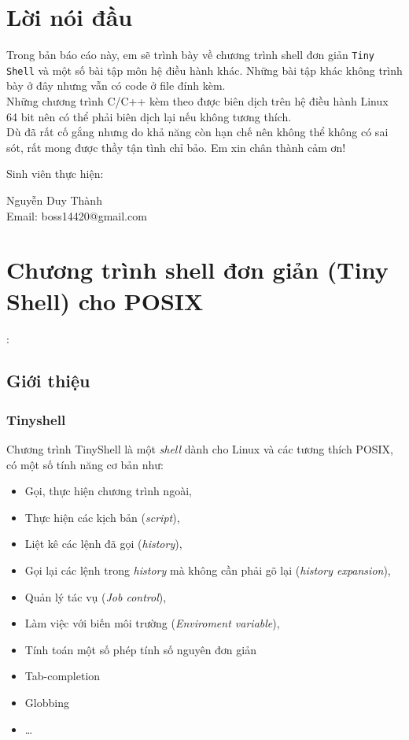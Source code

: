\documentclass[a4paper,12pt]{report}
\begin{document}
    \newpage

    \tableofcontents
    \newpage
\chapter{Lời nói đầu}
    Trong bản báo cáo này, em sẽ trình bày về chương trình shell đơn giản
    \texttt{Tiny Shell} và một số bài tập môn hệ điều hành khác. Những bài tập
    khác không trình bày ở đây nhưng vẫn có code ở file đính kèm.\\
    Những chương trình C/C++ kèm theo được biên dịch trên hệ điều hành Linux 64
    bit nên có thể phải biên dịch lại nếu không tương thích.\\

    Dù đã rất cố gắng nhưng do khả năng còn hạn chế nên không thể không có sai sót, rất
    mong được thầy tận tình chỉ bảo. Em xin chân thành cảm ơn!\\
    \begin{center}
        Sinh viên thực hiện:
        \parbox[t]{4cm}{Nguyễn Duy Thành \\ Email: boss14420@gmail.com}
    \end{center}



\chapter{Chương trình shell đơn giản (Tiny Shell) cho POSIX}:
    \section{Giới thiệu}
        \subsection{Tinyshell}
        Chương trình TinyShell là một \textit{shell} dành cho Linux và các tương
        thích POSIX, có một số tính năng cơ bản như:
        \begin{itemize}
            \item Gọi, thực hiện chương trình ngoài,
            \item Thực hiện các kịch bản (\textit{script}),
            \item Liệt kê các lệnh đã gọi (\textit{history}),
            \item Gọi lại các lệnh trong \textit{history} mà không cần phải gõ lại
                (\textit{history expansion}),
            \item Quản lý tác vụ (\textit{Job control}),
            \item Làm việc với biến môi trường (\textit{Enviroment variable}),
            \item Tính toán một số phép tính số nguyên đơn giản
            \item Tab-completion
            \item Globbing
            \item \ldots{}
        \end{itemize}
\end{document}
